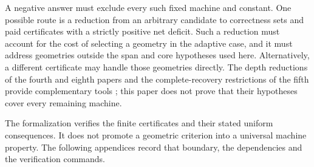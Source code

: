 A negative answer must exclude every such fixed machine and constant.
One possible route is a reduction from an arbitrary candidate to
correctness sets and paid certificates with a strictly positive net
deficit. Such a reduction must account for the cost of selecting a
geometry in the adaptive case, and it must address geometries outside
the span and core hypotheses used here. Alternatively, a different
certificate may handle those geometries directly. The depth reductions
of the fourth and eighth papers and the complete-recovery restrictions
of the fifth provide complementary tools
\cite{FourthPaper2026,EighthPaper2026,DirectedRecovery2026}; this paper
does not prove that their hypotheses cover every remaining machine.

The formalization verifies the finite certificates and their stated
uniform consequences. It does not promote a geometric criterion into
a universal machine property. The following appendices record that
boundary, the dependencies and the verification commands.
